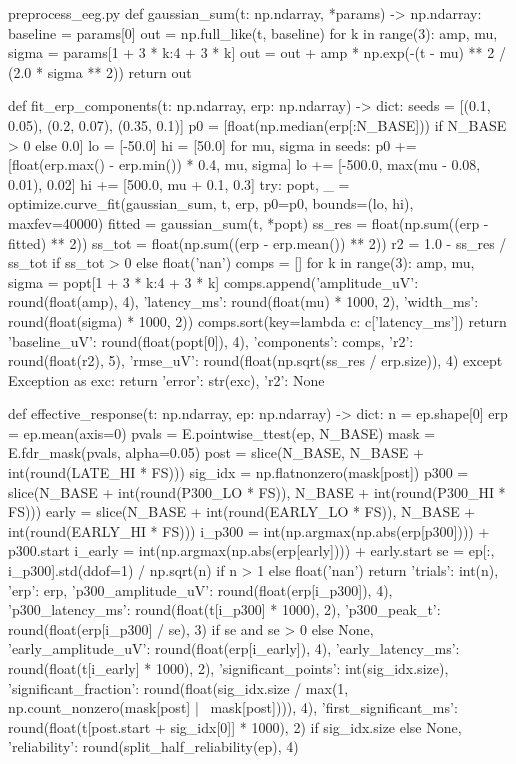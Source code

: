 \documentclass[bwprint]{gmcmthesis}
\begin{document}
\begin{appendices}
\begin{Python}{preprocess\_eeg.py}
def gaussian_sum(t: np.ndarray, *params) -> np.ndarray:
    baseline = params[0]
    out = np.full_like(t, baseline)
    for k in range(3):
        amp, mu, sigma = params[1 + 3 * k:4 + 3 * k]
        out = out + amp * np.exp(-(t - mu) ** 2 / (2.0 * sigma ** 2))
    return out

def fit_erp_components(t: np.ndarray, erp: np.ndarray) -> dict:
    seeds = [(0.1, 0.05), (0.2, 0.07), (0.35, 0.1)]
    p0 = [float(np.median(erp[:N_BASE])) if N_BASE > 0 else 0.0]
    lo = [-50.0]
    hi = [50.0]
    for mu, sigma in seeds:
        p0 += [float(erp.max() - erp.min()) * 0.4, mu, sigma]
        lo += [-500.0, max(mu - 0.08, 0.01), 0.02]
        hi += [500.0, mu + 0.1, 0.3]
    try:
        popt, _ = optimize.curve_fit(gaussian_sum, t, erp, p0=p0, bounds=(lo, hi), maxfev=40000)
        fitted = gaussian_sum(t, *popt)
        ss_res = float(np.sum((erp - fitted) ** 2))
        ss_tot = float(np.sum((erp - erp.mean()) ** 2))
        r2 = 1.0 - ss_res / ss_tot if ss_tot > 0 else float('nan')
        comps = []
        for k in range(3):
            amp, mu, sigma = popt[1 + 3 * k:4 + 3 * k]
            comps.append({'amplitude_uV': round(float(amp), 4), 'latency_ms': round(float(mu) * 1000, 2), 'width_ms': round(float(sigma) * 1000, 2)})
        comps.sort(key=lambda c: c['latency_ms'])
        return {'baseline_uV': round(float(popt[0]), 4), 'components': comps, 'r2': round(float(r2), 5), 'rmse_uV': round(float(np.sqrt(ss_res / erp.size)), 4)}
    except Exception as exc:
        return {'error': str(exc), 'r2': None}

def effective_response(t: np.ndarray, ep: np.ndarray) -> dict:
    n = ep.shape[0]
    erp = ep.mean(axis=0)
    pvals = E.pointwise_ttest(ep, N_BASE)
    mask = E.fdr_mask(pvals, alpha=0.05)
    post = slice(N_BASE, N_BASE + int(round(LATE_HI * FS)))
    sig_idx = np.flatnonzero(mask[post])
    p300 = slice(N_BASE + int(round(P300_LO * FS)), N_BASE + int(round(P300_HI * FS)))
    early = slice(N_BASE + int(round(EARLY_LO * FS)), N_BASE + int(round(EARLY_HI * FS)))
    i_p300 = int(np.argmax(np.abs(erp[p300]))) + p300.start
    i_early = int(np.argmax(np.abs(erp[early]))) + early.start
    se = ep[:, i_p300].std(ddof=1) / np.sqrt(n) if n > 1 else float('nan')
    return {'trials': int(n), 'erp': erp, 'p300_amplitude_uV': round(float(erp[i_p300]), 4), 'p300_latency_ms': round(float(t[i_p300] * 1000), 2), 'p300_peak_t': round(float(erp[i_p300] / se), 3) if se and se > 0 else None, 'early_amplitude_uV': round(float(erp[i_early]), 4), 'early_latency_ms': round(float(t[i_early] * 1000), 2), 'significant_points': int(sig_idx.size), 'significant_fraction': round(float(sig_idx.size / max(1, np.count_nonzero(mask[post] | ~mask[post]))), 4), 'first_significant_ms': round(float(t[post.start + sig_idx[0]] * 1000), 2) if sig_idx.size else None, 'reliability': round(split_half_reliability(ep), 4)}


\end{Python}
\end{appendices}
\end{document}
